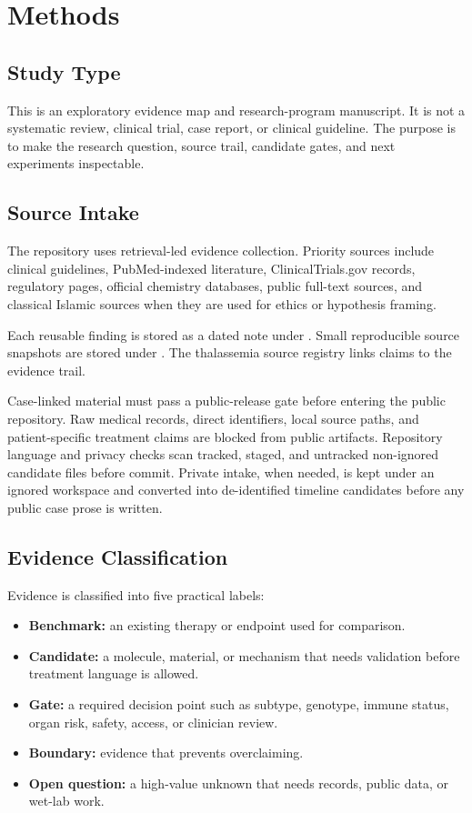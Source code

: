 \section{Methods}

\subsection{Study Type}

This is an exploratory evidence map and research-program manuscript. It is not
a systematic review, clinical trial, case report, or clinical guideline. The
purpose is to make the research question, source trail, candidate gates, and
next experiments inspectable.

\subsection{Source Intake}

The repository uses retrieval-led evidence collection. Priority sources include
clinical guidelines, PubMed-indexed literature, ClinicalTrials.gov records,
regulatory pages, official chemistry databases, public full-text sources, and
classical Islamic sources when they are used for ethics or hypothesis framing.

Each reusable finding is stored as a dated note under .
Small reproducible source snapshots are stored under . The
thalassemia source registry links claims to the evidence trail.

Case-linked material must pass a public-release gate before entering the public
repository. Raw medical records, direct identifiers, local source paths, and
patient-specific treatment claims are blocked from public artifacts. Repository
language and privacy checks scan tracked, staged, and untracked non-ignored
candidate files before commit. Private intake, when needed, is kept under an
ignored  workspace and converted into de-identified timeline
candidates before any public case prose is written.

\subsection{Evidence Classification}

Evidence is classified into five practical labels:

\begin{itemize}[leftmargin=*]
  \item \textbf{Benchmark:} an existing therapy or endpoint used for comparison.
  \item \textbf{Candidate:} a molecule, material, or mechanism that needs
  validation before treatment language is allowed.
  \item \textbf{Gate:} a required decision point such as subtype, genotype,
  immune status, organ risk, safety, access, or clinician review.
  \item \textbf{Boundary:} evidence that prevents overclaiming.
  \item \textbf{Open question:} a high-value unknown that needs records, public
  data, or wet-lab work.
\end{itemize}

